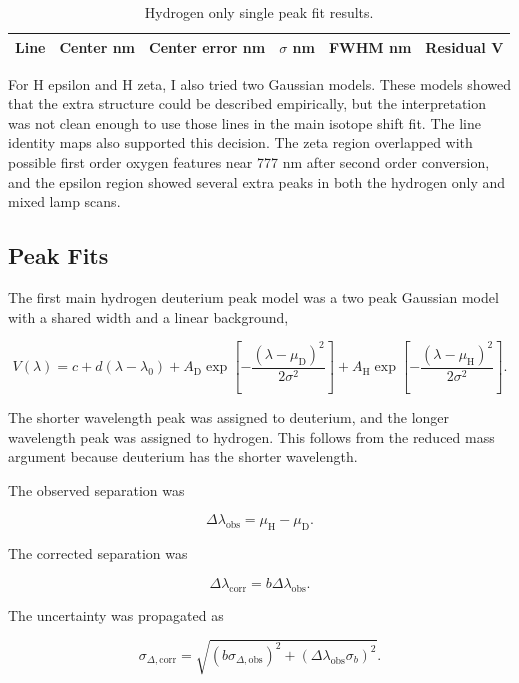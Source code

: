 \documentclass[11pt]{article}
\begin{document}
\begin{table}[htbp]
\centering
\caption{Hydrogen only single peak fit results.}
\label{tab:hcontrol}
\begin{tabular}{lrrrrr}
\hline
Line & Center nm & Center error nm & \(\sigma\) nm & FWHM nm & Residual V \\
\hline

\end{tabular}
\end{table}

For H epsilon and H zeta, I also tried two Gaussian models. These models showed that the extra structure could be described empirically, but the interpretation was not clean enough to use those lines in the main isotope shift fit. The line identity maps also supported this decision. The zeta region overlapped with possible first order oxygen features near 777 nm after second order conversion, and the epsilon region showed several extra peaks in both the hydrogen only and mixed lamp scans.

\subsection{Peak Fits}

The first main hydrogen deuterium peak model was a two peak Gaussian model with a shared width and a linear background,

\[
V(\lambda)
=
c + d(\lambda - \lambda_0)
+
A_{\mathrm{D}}\exp\left[-\frac{(\lambda-\mu_{\mathrm{D}})^2}{2\sigma^2}\right]
+
A_{\mathrm{H}}\exp\left[-\frac{(\lambda-\mu_{\mathrm{H}})^2}{2\sigma^2}\right].
\]

The shorter wavelength peak was assigned to deuterium, and the longer wavelength peak was assigned to hydrogen. This follows from the reduced mass argument because deuterium has the shorter wavelength.

The observed separation was

\[
\Delta\lambda_{\mathrm{obs}} = \mu_{\mathrm{H}} - \mu_{\mathrm{D}}.
\]

The corrected separation was

\[
\Delta\lambda_{\mathrm{corr}} = b\Delta\lambda_{\mathrm{obs}}.
\]

The uncertainty was propagated as

\[
\sigma_{\Delta,\mathrm{corr}}
=
\sqrt{
(b\sigma_{\Delta,\mathrm{obs}})^2
+
(\Delta\lambda_{\mathrm{obs}}\sigma_b)^2
}.
\]
\end{document}
